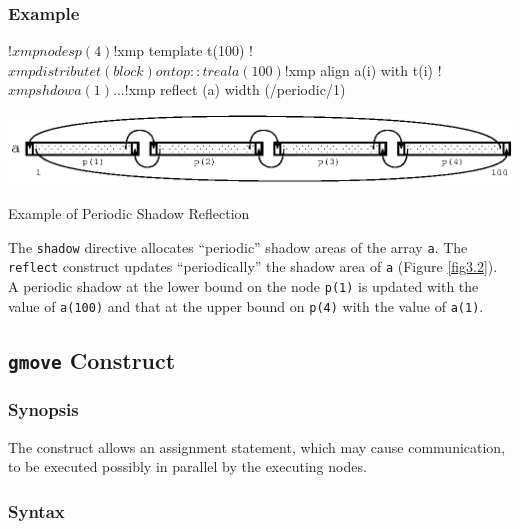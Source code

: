 \subsubsection*{Example}

\begin{XFexample}
!$xmp nodes p(4)
!$xmp template t(100)
!$xmp distribute t(block) onto p:: t

      real a(100)
!$xmp align a(i) with t(i)
!$xmp shdow a(1)

      ...
!$xmp reflect (a) width (/periodic/1)
\end{XFexample}

\begin{myfigure}
\begin{center}
\includegraphics[width=0.9\hsize]{figs/fig3.2.eps}
\end{center}
\caption{Example of Periodic Shadow Reflection}
\label{fig3.2}
\end{myfigure}

The {\tt shadow} directive allocates ``periodic'' shadow areas of the
array {\tt a}.
The {\tt reflect} construct updates ``periodically'' the shadow area of
{\tt a} (Figure \ref{fig3.2}). A periodic shadow at the lower
bound on the node {\tt p(1)} is updated with the value of {\tt a(100)}
and that at the upper bound on {\tt p(4)} with the value of {\tt a(1)}.


\subsection{{\tt gmove} Construct}

\subsubsection*{Synopsis}


The {\tt {}} construct allows an assignment statement,
which may cause communication, to be executed possibly in parallel by
the executing nodes.

\subsubsection*{Syntax}

